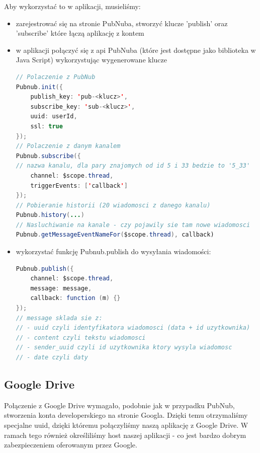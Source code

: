 \documentclass{report}
\begin{document}
		
		Aby wykorzystać to w aplikacji, musieliśmy:
		\begin{itemize}
		\item zarejestrować się na stronie PubNuba, stworzyć klucze 'publish' oraz 'subscribe' które łączą aplikację z kontem
		\item w aplikacji połączyć się z api PubNuba (które jest dostępne jako biblioteka w Java Script) wykorzystując wygenerowane klucze
\begin{lstlisting}[language=Java, breaklines]
// Polaczenie z PubNub
Pubnub.init({
	publish_key: 'pub-<klucz>',
	subscribe_key: 'sub-<klucz>',
	uuid: userId,
	ssl: true
});
// Polaczenie z danym kanalem
Pubnub.subscribe({
// nazwa kanalu, dla pary znajomych od id 5 i 33 bedzie to '5_33'
	channel: $scope.thread, 
	triggerEvents: ['callback']
});
// Pobieranie historii (20 wiadomosci z danego kanalu)
Pubnub.history(...)
// Nasluchiwanie na kanale - czy pojawily sie tam nowe wiadomosci
Pubnub.getMessageEventNameFor($scope.thread), callback)
\end{lstlisting}
		\item wykorzystać funkcję Pubnub.publish do wysyłania wiadomości:
\begin{lstlisting}[language=Java, breaklines]
Pubnub.publish({
	channel: $scope.thread,
	message: message,
	callback: function (m) {}
});
// message sklada sie z: 
// - uuid czyli identyfikatora wiadomosci (data + id uzytkownika)
// - content czyli tekstu wiadomosci
// - sender_uuid czyli id uzytkownika ktory wysyla wiadomosc
// - date czyli daty
\end{lstlisting}		
		\end{itemize}
		
		\subsection{Google Drive}
		
		Połączenie z Google Drive wymagało, podobnie jak w przypadku PubNub, stworzenia konta developerskiego na stronie Googla. Dzięki temu otrzymaliśmy specjalne uuid, dzięki któremu połączyliśmy naszą aplikację z Google Drive. W ramach tego również określiliśmy host naszej aplikacji - co jest bardzo dobrym zabezpieczeniem oferowanym przez Google.
		
\end{document}
